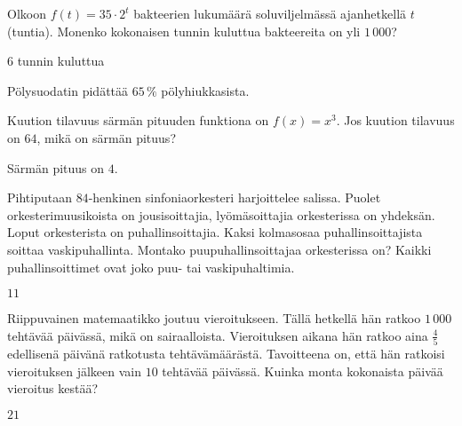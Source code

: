 \begin{multicols}{2}
\begin{tehtava}
Olkoon $f(t) = 35 \cdot 2^t$ bakteerien lukumäärä soluviljelmässä ajanhetkellä $t$ (tuntia). Monenko kokonaisen tunnin kuluttua bakteereita on yli $1\,000$?
	\begin{vastaus}
	$6$ tunnin kuluttua
	\end{vastaus}
\end{tehtava}

\begin{tehtava}
	Pölysuodatin pidättää $65\,\%$ pölyhiukkasista.
\begin{vastaus}
\end{vastaus}
\end{tehtava}

\begin{tehtava}
Kuution tilavuus särmän pituuden funktiona on $f(x) = x^3$. Jos kuution tilavuus on $64$, mikä on särmän pituus?
\begin{vastaus}
Särmän pituus on $4$.
\end{vastaus}
\end{tehtava}

\begin{tehtava}
	Pihtiputaan $84$-henkinen sinfoniaorkesteri harjoittelee salissa. Puolet orkesterimuusikoista on jousisoittajia, lyömäsoittajia orkesterissa on yhdeksän. Loput orkesterista on puhallinsoittajia. Kaksi kolmasosaa puhallinsoittajista soittaa vaskipuhallinta. Montako puupuhallinsoittajaa orkesterissa on? Kaikki puhallinsoittimet ovat joko puu- tai vaskipuhaltimia.
	\begin{vastaus}
	$11$
	\end{vastaus}
\end{tehtava}

\begin{tehtava}
	Riippuvainen matemaatikko joutuu vieroitukseen. Tällä hetkellä hän ratkoo $1\,000$ tehtävää päivässä, mikä on sairaalloista. Vieroituksen aikana hän ratkoo aina $\frac{4}{5}$ edellisenä päivänä ratkotusta tehtävämäärästä. Tavoitteena on, että hän ratkoisi vieroituksen jälkeen vain $10$ tehtävää päivässä. Kuinka monta kokonaista päivää vieroitus kestää?
	\begin{vastaus}
	$21$
	\end{vastaus}
\end{tehtava}


\end{multicols}

